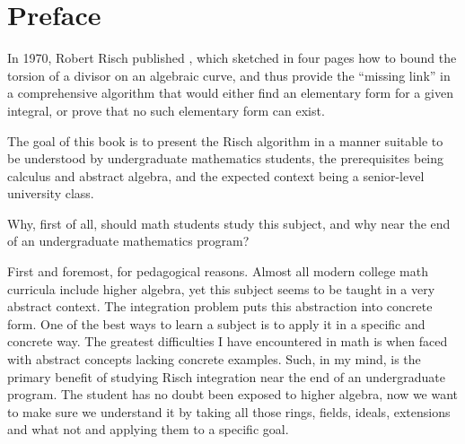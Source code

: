 
\chapter*{Preface}

\begin{comment}
This book grew out of an abortive class in Risch Integration that I
taught at University of Maryland at College Park in the spring of
2006,\footnote{I am not a professor at UMCP, and am not affiliated
with the University of Maryland in any way other than having studied
physics there as an undergraduate and being a member of the University
Alumni Association.}  which I canceled after three weeks when I
had no students left.  Aside from the lack of student interest (it was
a non-credit class), another deficiency in the class became apparent
to me --- the lack of a good textbook.  So I am writing this book to
fill this perceived gap, the need for a senior level undergraduate
text on differential algebra, developing the subject so far as the
solution of the problem of integration in finite terms (the
integration problem), the theory's most famous application to date.
\end{comment}

In 1970, Robert Risch published \cite{risch}, which sketched in four
pages how to bound the torsion of a divisor on an algebraic curve, and
thus provide the ``missing link'' in a comprehensive algorithm that
would either find an elementary form for a given integral, or prove
that no such elementary form can exist.

The goal of this book is to present the Risch algorithm in a manner
suitable to be understood by undergraduate mathematics students, the
prerequisites being calculus and abstract algebra, and the expected
context being a senior-level university class.

Why, first of all, should math students study this subject, and why
near the end of an undergraduate mathematics program?

First and foremost, for pedagogical reasons.  Almost all modern
college math curricula include higher algebra, yet this subject seems
to be taught in a very abstract context.  The integration problem puts
this abstraction into concrete form.
One of the best ways to learn a subject
is to apply it in a specific and concrete way.  The greatest
difficulties I have encountered in math is when faced with abstract
concepts lacking concrete examples.  Such, in my mind, is the primary
benefit of studying Risch integration near the end of an undergraduate
program.  The student has no doubt been exposed to higher algebra, now
we want to make sure we understand it by taking all those rings,
fields, ideals, extensions and what not and applying them to a
specific goal.

